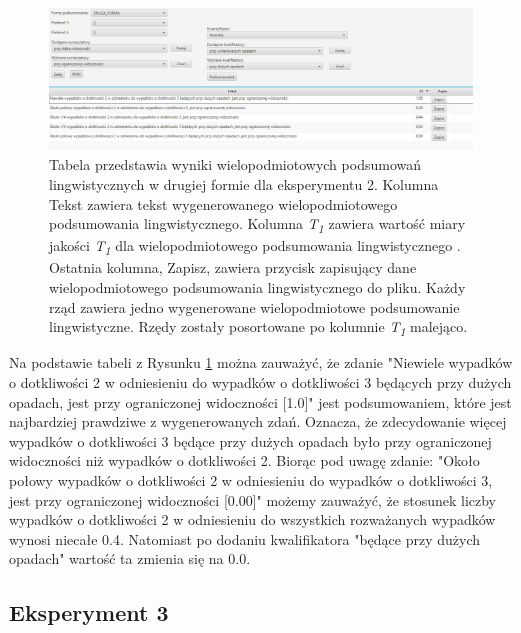 \documentclass{classrep}
\begin{document}
\newpage

\begin{figure}[h!]
\centering
\includegraphics[width=15cm]{ex_wiel2_2.png}
\vspace{-0.3cm}
\caption{Tabela przedstawia wyniki wielopodmiotowych podsumowań lingwistycznych w drugiej formie dla eksperymentu 2. Kolumna Tekst zawiera tekst wygenerowanego wielopodmiotowego podsumowania lingwistycznego. Kolumna \textit{T\textsubscript{1}} zawiera wartość miary jakości \textit{T\textsubscript{1}} dla wielopodmiotowego podsumowania lingwistycznego \cite{niewiadomski19}. Ostatnia kolumna, Zapisz, zawiera przycisk zapisujący dane wielopodmiotowego podsumowania lingwistycznego do pliku. Każdy rząd zawiera jedno wygenerowane wielopodmiotowe podsumowanie lingwistyczne. Rzędy zostały posortowane po kolumnie \textit{T\textsubscript{1}} malejąco. }
\label{wykr_ex_wiel2_2}
\end{figure}



Na podstawie tabeli z Rysunku \ref{wykr_ex_wiel2_2} można zauważyć, że zdanie "Niewiele wypadków o dotkliwości 2 w odniesieniu do wypadków o dotkliwości 3 będących przy dużych opadach, jest przy ograniczonej widoczności [1.0]" jest podsumowaniem, które jest najbardziej prawdziwe z wygenerowanych zdań. Oznacza, że zdecydowanie więcej wypadków o dotkliwości 3 będące przy dużych opadach było przy ograniczonej widoczności niż wypadków o dotkliwości 2. Biorąc pod uwagę zdanie: "Około połowy wypadków o dotkliwości 2 w odniesieniu do wypadków o dotkliwości 3, jest przy ograniczonej widoczności [0.00]" możemy zauważyć, że stosunek liczby wypadków o dotkliwości 2 w odniesieniu do wszystkich rozważanych wypadków wynosi niecałe 0.4. Natomiast po dodaniu kwalifikatora "będące przy dużych opadach" wartość ta zmienia się na 0.0.





\newpage
\subsection{Eksperyment 3}
\label{section:ex_wiel3}
\end{document}
